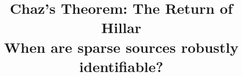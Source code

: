 \documentclass[journal,onecolumn]{IEEEtran}
\begin{document}
%
\title{Chaz's Theorem: The Return of Hillar\\ {\large When are sparse sources robustly identifiable?}}

%
%
%




% 
%



% 
\end{document}
